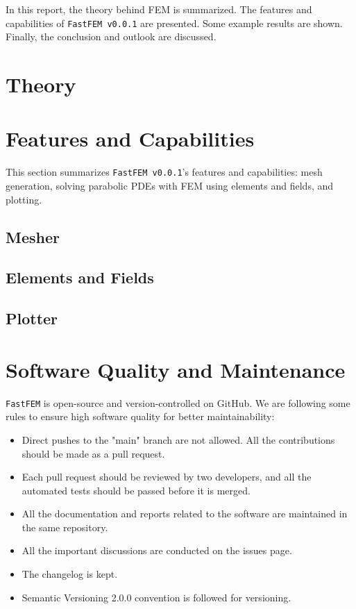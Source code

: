 \documentclass[headings=standardclasses, abstract=true]{scrartcl}
\begin{document}
In this report, the theory behind FEM is summarized. The features and capabilities of \texttt{FastFEM v0.0.1} are presented. Some example results are shown. Finally, the conclusion and outlook are discussed.

\section{Theory}


\section{Features and Capabilities}

This section summarizes \texttt{FastFEM v0.0.1}'s features and capabilities: mesh generation, solving parabolic PDEs with FEM using elements and fields, and plotting.

\subsection{Mesher} \label{sec:mesher}


\subsection{Elements and Fields}\label{sec:elem_field}


\subsection{Plotter}


\section{Software Quality and Maintenance}

\texttt{FastFEM} is open-source and version-controlled on GitHub\supercite{fastfem}. We are following some rules to ensure high software quality for better maintainability:

\begin{itemize}
    \item Direct pushes to the "main" branch are not allowed. All the contributions should be made as a pull request.
    \item Each pull request should be reviewed by two developers, and all the automated tests should be passed before it is merged.
    \item All the documentation and reports related to the software are maintained in the same repository.
    \item All the important discussions are conducted on the issues page.
    \item The changelog is kept.
    \item Semantic Versioning 2.0.0\supercite{semanticVersioning} convention is followed for versioning.
\end{itemize}
\end{document}
